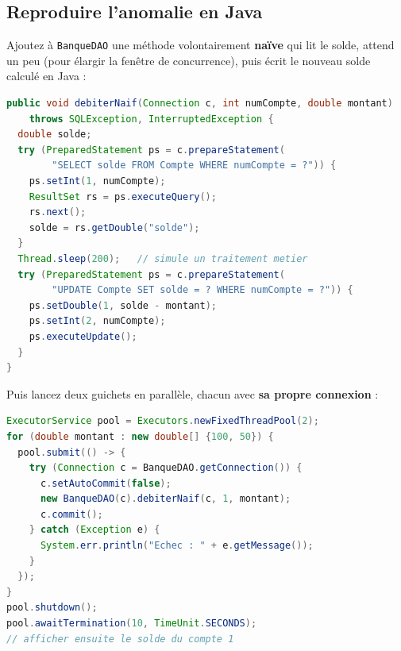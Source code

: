 \documentclass[11pt]{article}
\begin{document}
\subsection{Reproduire l'anomalie en Java}

Ajoutez à \texttt{BanqueDAO} une méthode volontairement \textbf{naïve} qui lit le solde, attend un peu
(pour élargir la fenêtre de concurrence), puis écrit le nouveau solde calculé en Java :

\begin{lstlisting}[language=Java]
public void debiterNaif(Connection c, int numCompte, double montant)
    throws SQLException, InterruptedException {
  double solde;
  try (PreparedStatement ps = c.prepareStatement(
        "SELECT solde FROM Compte WHERE numCompte = ?")) {
    ps.setInt(1, numCompte);
    ResultSet rs = ps.executeQuery();
    rs.next();
    solde = rs.getDouble("solde");
  }
  Thread.sleep(200);   // simule un traitement metier
  try (PreparedStatement ps = c.prepareStatement(
        "UPDATE Compte SET solde = ? WHERE numCompte = ?")) {
    ps.setDouble(1, solde - montant);
    ps.setInt(2, numCompte);
    ps.executeUpdate();
  }
}
\end{lstlisting}

Puis lancez deux guichets en parallèle, chacun avec \textbf{sa propre connexion} :

\begin{lstlisting}[language=Java]
ExecutorService pool = Executors.newFixedThreadPool(2);
for (double montant : new double[] {100, 50}) {
  pool.submit(() -> {
    try (Connection c = BanqueDAO.getConnection()) {
      c.setAutoCommit(false);
      new BanqueDAO(c).debiterNaif(c, 1, montant);
      c.commit();
    } catch (Exception e) {
      System.err.println("Echec : " + e.getMessage());
    }
  });
}
pool.shutdown();
pool.awaitTermination(10, TimeUnit.SECONDS);
// afficher ensuite le solde du compte 1
\end{lstlisting}
\end{document}
